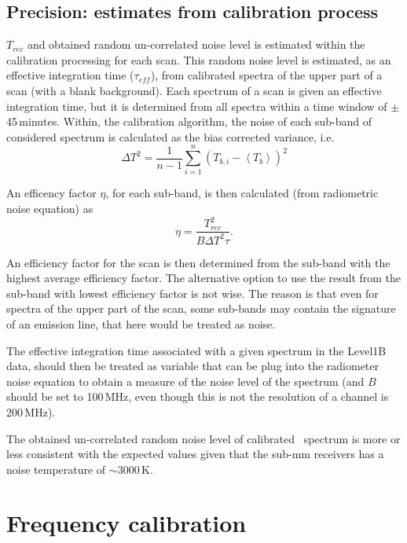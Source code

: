 \subsection*{Precision: estimates from calibration process}

\(T_{rec}\) and obtained random un-correlated noise level is estimated within the 
calibration processing for each scan.
This random noise level is estimated, as an effective integration time
(\(\tau_{eff}\)), from calibrated spectra of the upper part of a scan 
(with a blank background). Each spectrum of a scan is given an effective
integration time, but it is determined from all spectra within a time
window of \(\pm\)45\,minutes. 
Within, the calibration algorithm, the noise of each sub-band of
considered spectrum is calculated as the bias corrected variance, i.e.
\begin{equation}
\Delta T^{2} = \frac{1}{n-1}\sum_{i=1}^{n}(T_{b,i}-\left<T_{b}\right>)^{2}
\end{equation}

An efficency factor \(\eta\), for each sub-band, is then calculated (from radiometric noise equation) as
\begin{equation}
\eta = \frac{T_{rec}^2}{B\Delta T^{2}\tau}.
\end{equation}

An efficiency factor for the scan is then determined from the sub-band
with the highest average efficiency factor. The alternative option
to use the result from the sub-band with lowest efficiency factor
is not wise. The reason is that even for spectra of the upper part
of the scan, some sub-bands may contain the signature of an emission 
line, that here would be treated as noise.

The effective integration time associated with a given spectrum
in the Level1B data, should then be treated as 
variable that can be plug into the radiometer noise equation
to obtain a measure of the noise level of the spectrum
(and \(B\) should be set to 100\,MHz, even though this is not
the resolution of a channel is 200\,MHz).

The obtained un-correlated random noise level of calibrated \smr\
spectrum is more or less consistent with the expected values
given that the sub-mm receivers has a noise temperature
of \(\sim\)3000\,K.	    


\section{Frequency calibration}

